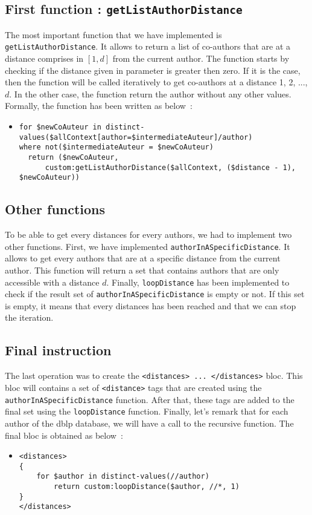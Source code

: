 \documentclass{article}
\begin{document}
  \subsection{First function : \texttt{getListAuthorDistance}}
  The most important function that we have implemented is \verb|getListAuthorDistance|. It allows to return a list of co-authors that are at a distance comprises in $[1,d]$ from the current author. The function starts by checking if the distance given in parameter is greater then zero. If it is the case, then the function will be called iteratively to get co-authors at a distance 1, 2, ..., $d$. In the other case, the function return the author without any other values. Formally, the function has been written as below~:
    \begin{itemize}
      \item \begin{verbatim}
for $newCoAuteur in distinct-values($allContext[author=$intermediateAuteur]/author)
where not($intermediateAuteur = $newCoAuteur)
  return ($newCoAuteur, 
      custom:getListAuthorDistance($allContext, ($distance - 1), $newCoAuteur))\end{verbatim}
    \end{itemize}
    
  \subsection{Other functions}
    To be able to get every distances for every authors, we had to implement two other functions. First, we have implemented \verb|authorInASpecificDistance|. It allows to get every authors that are at a specific distance from the current author. This function will return a set that contains authors that are only accessible with a distance $d$.  Finally, \verb|loopDistance| has been implemented to check if the result set of \verb|authorInASpecificDistance| is empty or not. If this set is empty, it means that every distances has been reached and that we can stop the iteration.
  
  \subsection{Final instruction}
  The last operation was to create the \verb|<distances> ... </distances>| bloc. This bloc will contains a set of \verb|<distance>| tags that are created using the \verb|authorInASpecificDistance| function. After that, these tags are added to the final set using the \verb|loopDistance| function. Finally, let's remark that for each author of the dblp database, we will have a call to the recursive function. The final bloc is obtained as below~:
    \begin{itemize}
      \item \begin{verbatim}
<distances>
{
    for $author in distinct-values(//author)
        return custom:loopDistance($author, //*, 1)
}
</distances>\end{verbatim}
    \end{itemize}
\end{document}
